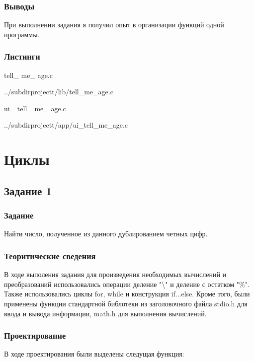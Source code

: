 \documentclass[12pt,a4paper]{report}
\begin{document}
		\vspace{\baselineskip}
		
		
\subsection{Выводы}

При выполнении задания я получил опыт в организации функций одной программы.

\subsection*{Листинги}
tell\_ me\_ age.c

{../subdirprojectt/lib/tell_me_age.c}

\vspace{\baselineskip}

ui\_ tell\_ me\_ age.c

{../subdirprojectt/app/ui_tell_me_age.c}


\chapter{Циклы}
\section{Задание 1}
\subsection{Задание}

Найти число, полученное из данного дублированием четных цифр.

\subsection{Теоритические сведения}

В ходе выполения задания для произведения необходимых вычислений и преобразований использовались операции деление "\textbackslash" и деление с остатком "\%". Также использовались циклы for, while и конструкция if...else. Кроме того, были применены функции стандартной библотеки из заголовочного файла stdio.h для ввода и вывода информации, math.h для выполнения вычислений.


\subsection{Проектирование}

В ходе проектирования были выделены следущая функция:
\end{document}
